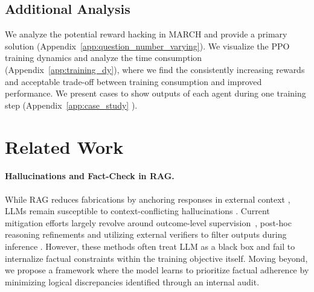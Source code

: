 \documentclass[10pt, a4paper, logo]{googledeepmind} %
\begin{document}
\subsection{Additional Analysis}
We analyze the potential reward hacking in MARCH and provide a primary solution (Appendix~\ref{app:question_number_varying}). We visualize the PPO training dynamics and analyze the time consumption (Appendix~\ref{app:training_dy}), where we find the consistently increasing rewards and acceptable trade-off between training consumption and improved performance. We present cases to show outputs of each agent during one training step (Appendix~\ref{app:case_study} ).

\section{Related Work}
\paragraph{Hallucinations and Fact-Check in RAG.}
While RAG reduces fabrications by anchoring responses in external context \citep{lewis2020retrieval}, LLMs remain susceptible to context-conflicting hallucinations \citep{shuster2021retrievalaugmentationreduceshallucination}. Current mitigation efforts largely revolve around outcome-level supervision~\citep{shi2023replugretrievalaugmentedblackboxlanguage,gekhman2024doesfinetuningllmsnew,yu2024chainofnoteenhancingrobustnessretrievalaugmented,asai2023selfraglearningretrievegenerate}, post-hoc reasoning refinements and utilizing external verifiers to filter outputs during inference \citep{dhuliawala2023chainofverificationreduceshallucinationlarge,madaan2023selfrefineiterativerefinementselffeedback,min-etal-2023-factscore,rashkin2023measuring,gao-etal-2023-rarr,tang2024minicheck}. However, these methods often treat LLM as a black box and fail to internalize factual constraints within the training objective itself. Moving beyond, we propose a framework where the model learns to prioritize factual adherence by minimizing logical discrepancies identified through an internal audit.
\end{document}
